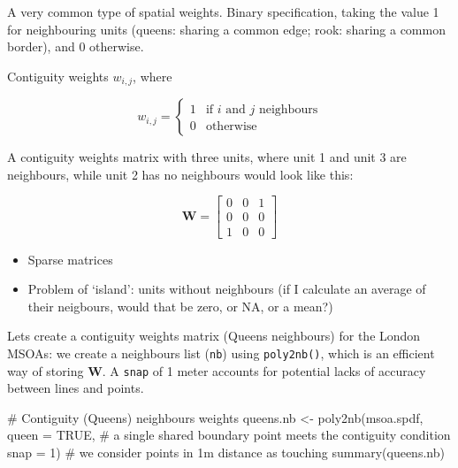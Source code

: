 \documentclass[
  letterpaper,
]{scrbook}
\newenvironment{Shaded}{\begin{snugshade}}{\end{snugshade}}
\newcommand{\AttributeTok}[1]{\textcolor[rgb]{0.40,0.45,0.13}{#1}}
\newcommand{\CommentTok}[1]{\textcolor[rgb]{0.37,0.37,0.37}{#1}}
\newcommand{\ConstantTok}[1]{\textcolor[rgb]{0.56,0.35,0.01}{#1}}
\newcommand{\DecValTok}[1]{\textcolor[rgb]{0.68,0.00,0.00}{#1}}
\newcommand{\FunctionTok}[1]{\textcolor[rgb]{0.28,0.35,0.67}{#1}}
\newcommand{\NormalTok}[1]{\textcolor[rgb]{0.00,0.23,0.31}{#1}}
\newcommand{\OtherTok}[1]{\textcolor[rgb]{0.00,0.23,0.31}{#1}}
\begin{document}
A very common type of spatial weights. Binary specification, taking the
value 1 for neighbouring units (queens: sharing a common edge; rook:
sharing a common border), and 0 otherwise.

Contiguity weights \(w_{i,j}\), where

\[
  w_{i,j} =
    \begin{cases}
      1 & \text{if $i$ and $j$ neighbours}\\
      0 & \text{otherwise}
    \end{cases}       
\]

A contiguity weights matrix with three units, where unit 1 and unit 3
are neighbours, while unit 2 has no neighbours would look like this:

\[
\boldsymbol{\mathbf{W}}  = \begin{bmatrix} 
    0 & 0 & 1  \\
    0 & 0 & 0  \\
    1 & 0 & 0  
    \end{bmatrix}   \nonumber
\]

\begin{itemize}
\item
  Sparse matrices
\item
  Problem of `island': units without neighbours (if I calculate an
  average of their neigbours, would that be zero, or NA, or a mean?)
\end{itemize}

Lets create a contiguity weights matrix (Queens neighbours) for the
London MSOAs: we create a neighbours list (\texttt{nb}) using
\texttt{poly2nb()}, which is an efficient way of storing
\({\boldsymbol{\mathbf{W}}}\). A \texttt{snap} of 1 meter accounts for
potential lacks of accuracy between lines and points.

\begin{Shaded}
\begin{Highlighting}[]
\CommentTok{\# Contiguity (Queens) neighbours weights}
\NormalTok{queens.nb }\OtherTok{\textless{}{-}} \FunctionTok{poly2nb}\NormalTok{(msoa.spdf, }
                     \AttributeTok{queen =} \ConstantTok{TRUE}\NormalTok{, }\CommentTok{\# a single shared boundary point meets the contiguity condition}
                     \AttributeTok{snap =} \DecValTok{1}\NormalTok{) }\CommentTok{\# we consider points in 1m distance as \textquotesingle{}touching\textquotesingle{}}
\FunctionTok{summary}\NormalTok{(queens.nb)}
\end{Highlighting}
\end{Shaded}
\end{document}
